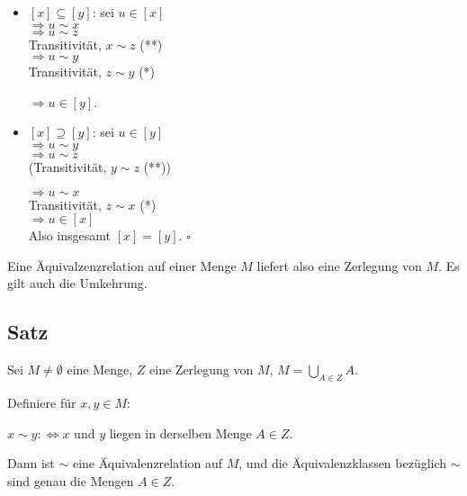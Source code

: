 \documentclass[a4paper, 12pt, twoside] {article}
\begin{document}
\begin{itemize}
\item $[x] \subseteq [y]$: sei $u \in [x]$ \\
$\Rightarrow u \sim x$ \\
$\Rightarrow u \sim z$ \\
Transitivität, $x \sim z$ (**) \\
$\Rightarrow u \sim y$ \\
Transitivität, $z \sim y$ (*)

$\Rightarrow u \in [y]$.

\item $[x] \supseteq [y]$: sei $u \in [y]$ \\
$\Rightarrow u \sim y$ \\
$\Rightarrow u \sim z$ \\
(Transitivität, $y \sim z$ (**))

$\Rightarrow u \sim x$ \\
Transitivität, $z \sim x$ (*) \\
$\Rightarrow u \in [x]$ \\
Also insgesamt $[x] = [y]$. \hfill $\square$

\end{itemize}


Eine Äquivalzenzrelation auf einer Menge $M$ liefert also eine Zerlegung von $M$. Es gilt auch die Umkehrung.

\subsection[Satz zu Äquivalenzrelationen]{Satz} %

Sei $M \neq \emptyset$ eine Menge, $Z$ eine Zerlegung von $M$, $M= \displaystyle\bigcup_{A \in Z} A$.

Definiere für $x,y \in M$:

$x \sim y :\Leftrightarrow x$ und $y$ liegen in derselben Menge $A \in Z$.

Dann ist $\sim$ eine Äquivalenzrelation auf $M$, und die Äquivalenzklassen bezüglich $\sim$ sind genau die Mengen $A \in Z$.

\end{document}

